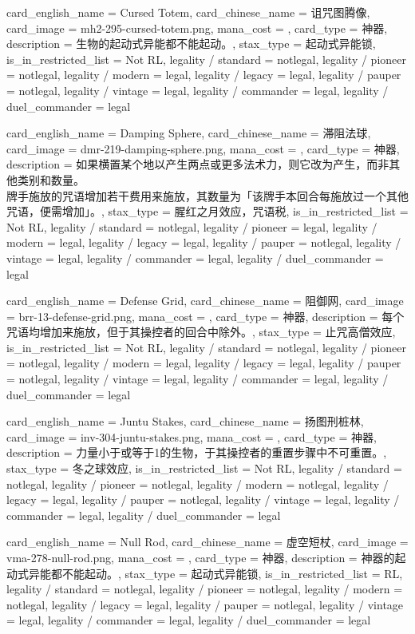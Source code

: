 \documentclass[lang = cn, color = black, 10pt]{AllThatStax}
\begin{document}
\card
{
	card_english_name = {Cursed Totem},
	card_chinese_name = {诅咒图腾像},
	card_image = mh2-295-cursed-totem.png,
	mana_cost = ,
	card_type = 神器,
	description = {生物的起动式异能都不能起动。},
	stax_type = 起动式异能锁,
	is_in_restricted_list = Not RL,
	legality / standard = notlegal,
	legality / pioneer = notlegal,
	legality / modern = legal,
	legality / legacy = legal,
	legality / pauper = notlegal,
	legality / vintage = legal,
	legality / commander = legal,
	legality / duel_commander = legal
}

\card
{
	card_english_name = {Damping Sphere},
	card_chinese_name = {滞阻法球},
	card_image = dmr-219-damping-sphere.png,
	mana_cost = ,
	card_type = 神器,
	description = {如果横置某个地以产生两点或更多法术力，则它改为产生，而非其他类别和数量。\\
牌手施放的咒语增加若干费用来施放，其数量为「该牌手本回合每施放过一个其他咒语，便需增加」。},
	stax_type = 腥红之月效应，咒语税,
	is_in_restricted_list = Not RL,
	legality / standard = notlegal,
	legality / pioneer = legal,
	legality / modern = legal,
	legality / legacy = legal,
	legality / pauper = notlegal,
	legality / vintage = legal,
	legality / commander = legal,
	legality / duel_commander = legal
}

\card
{
	card_english_name = {Defense Grid},
	card_chinese_name = {阻御网},
	card_image = brr-13-defense-grid.png,
	mana_cost = ,
	card_type = 神器,
	description = {每个咒语均增加来施放，但于其操控者的回合中除外。},
	stax_type = 止咒高僧效应,
	is_in_restricted_list = Not RL,
	legality / standard = notlegal,
	legality / pioneer = notlegal,
	legality / modern = legal,
	legality / legacy = legal,
	legality / pauper = notlegal,
	legality / vintage = legal,
	legality / commander = legal,
	legality / duel_commander = legal
}

\card
{
	card_english_name = {Juntu Stakes},
	card_chinese_name = {扬图刑桩林},
	card_image = inv-304-juntu-stakes.png,
	mana_cost = ,
	card_type = 神器,
	description = {力量小于或等于1的生物，于其操控者的重置步骤中不可重置。},
	stax_type = 冬之球效应,
	is_in_restricted_list = Not RL,
	legality / standard = notlegal,
	legality / pioneer = notlegal,
	legality / modern = notlegal,
	legality / legacy = legal,
	legality / pauper = notlegal,
	legality / vintage = legal,
	legality / commander = legal,
	legality / duel_commander = legal
}

\card
{
	card_english_name = {Null Rod},
	card_chinese_name = {虚空短杖},
	card_image = vma-278-null-rod.png,
	mana_cost = ,
	card_type = 神器,
	description = {神器的起动式异能都不能起动。},
	stax_type = 起动式异能锁,
	is_in_restricted_list = RL,
	legality / standard = notlegal,
	legality / pioneer = notlegal,
	legality / modern = notlegal,
	legality / legacy = legal,
	legality / pauper = notlegal,
	legality / vintage = legal,
	legality / commander = legal,
	legality / duel_commander = legal
}
\end{document}
